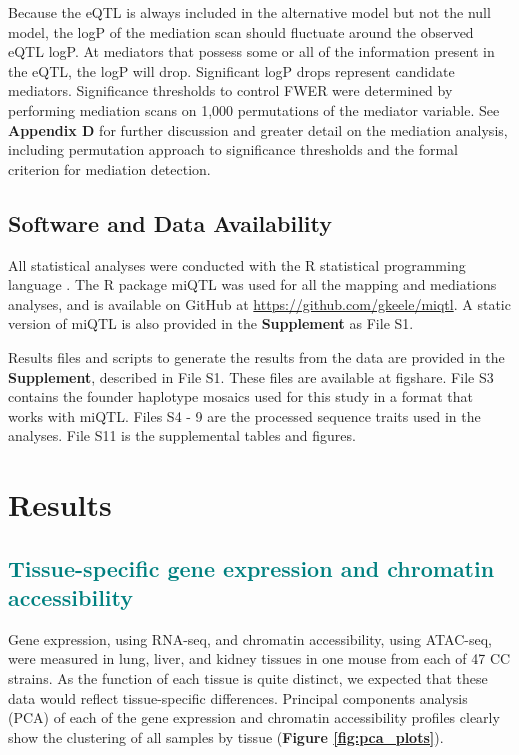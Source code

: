 \documentclass[9pt,twocolumn,twoside]{gsajnl}
\newcommand{\WV}[2]{\textcolor{red}{#1\footnote{\textcolor{red}{WV: #2}}}}
\newcommand{\WVinline}[1]{\textcolor{red}{#1}}
\newcommand{\GKinline}[1]{\textcolor{teal}{#1}}
\begin{document}
Because the eQTL is always included in the alternative model but not the null model, the logP of the mediation scan should fluctuate around the observed eQTL logP. At mediators that possess some or all of the information present in the eQTL, the logP will drop. Significant logP drops represent candidate mediators. Significance thresholds to control FWER were determined by performing mediation scans on 1,000 permutations of the mediator variable. See \textbf{Appendix D} for further discussion and greater detail on the mediation analysis, including permutation approach to significance thresholds and the formal criterion for mediation detection.

\subsection{Software and Data Availability}

All statistical analyses were conducted with the R statistical programming language \citep{RSoftware2019}. The R package miQTL was used for all the mapping and mediations analyses, and is available on GitHub at \url{https://github.com/gkeele/miqtl}. A static version of miQTL is also provided in the \textbf{Supplement} as File S1.

Results files and scripts to generate the results from the data are provided in the \textbf{Supplement}, described in File S1. These files are available at figshare. File S3 contains the founder haplotype mosaics used for this study in a format that works with miQTL. Files S4 - 9 are the processed sequence traits used in the analyses. File S11 is the supplemental tables and figures.

\section{Results}


\subsection{\GKinline{Tissue-specific gene expression and chromatin accessibility}} %

Gene expression, using RNA-seq, and chromatin accessibility, using ATAC-seq, were measured in lung, liver, and kidney tissues in one mouse from each of 47 CC strains. As the function of each tissue is quite distinct, we expected that these data would reflect tissue-specific differences. Principal components analysis (PCA) of each of the gene expression and chromatin accessibility profiles clearly show the clustering of all samples by tissue (\textbf{Figure \ref{fig:pca_plots}}). 
\end{document}
